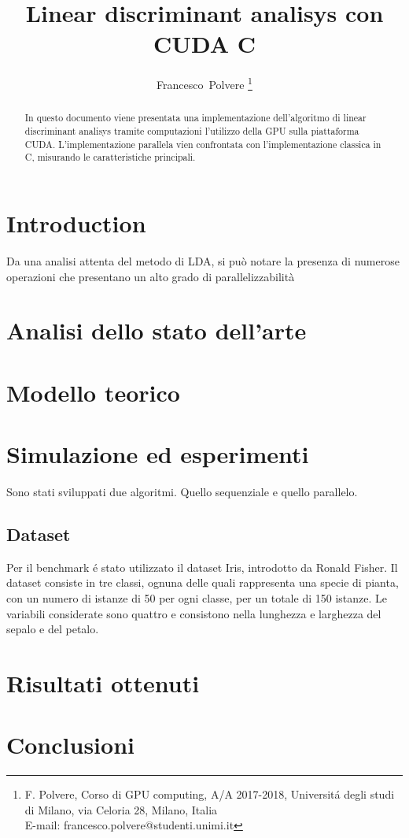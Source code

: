 \documentclass[twocolumn]{article}
\begin{document}
	\title{Linear discriminant analisys con CUDA C}
	\author{Francesco~Polvere
		\thanks{F. Polvere, Corso di GPU computing,  A/A 2017-2018, Universit\'a degli studi di Milano,
			via Celoria 28, Milano, Italia \protect\\
			E-mail: francesco.polvere@studenti.unimi.it}%
	}
	\maketitle
	\begin{abstract}
		In questo documento viene presentata una implementazione dell'algoritmo di linear discriminant analisys tramite computazioni l'utilizzo della GPU sulla piattaforma CUDA. 
		L'implementazione parallela vien confrontata con l'implementazione classica in C, misurando le caratteristiche principali.
	
	
\end{abstract}
\section{Introduction}
Da una analisi attenta del metodo di LDA, si può notare la presenza di numerose operazioni che presentano un alto grado di parallelizzabilità
\section{Analisi dello stato dell'arte}
\lipsum[1-2]
\section{Modello teorico}
\lipsum[1-5]
\section{Simulazione ed esperimenti}
Sono stati sviluppati due algoritmi. Quello sequenziale e quello parallelo.
\subsection{Dataset}
Per il benchmark \'e stato utilizzato il dataset Iris, introdotto da Ronald Fisher. Il dataset consiste in tre classi, ognuna delle quali rappresenta una specie di pianta, con un numero di istanze di 50 per ogni classe, per un totale di 150 istanze.
Le variabili considerate sono quattro e consistono nella lunghezza e larghezza del sepalo e del petalo.
\section{Risultati ottenuti}

\section{Conclusioni}
\lipsum[1-2]
\end{document}

